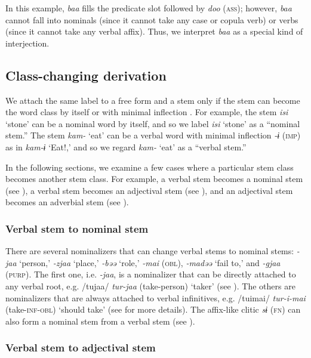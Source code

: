 In this example, \textit{baa} fills the predicate slot followed by \textit{doo} (\textsc{ass}); however, \textit{baa} cannot fall into nominals (since it cannot take any case or copula verb) or verbs (since it cannot take any verbal affix). Thus, we interpret \textit{baa} as a special kind of interjection.

\subsection{Class-changing derivation}\label{sec:4.3.8}

We attach the same label to a free form and a stem only if the stem can become the word class by itself or with minimal inflection \citep[cf.][553-554]{Lehmann2008}. For example, the stem \textit{isi} ‘stone’ can be a nominal word by itself, and so we label \textit{isi} ‘stone’ as a “nominal stem.” The stem \textit{kam-} ‘eat’ can be a verbal word with minimal inflection \textit{{}-ɨ} (\textsc{imp}) as in \textit{kam-ɨ} ‘Eat!,’ and so we regard \textit{kam-} ‘eat’ as a “verbal stem.”

In the following sections, we examine a few cases where a particular stem class becomes another stem class. For example, a verbal stem becomes a nominal stem (see ), a verbal stem becomes an adjectival stem (see ), and an adjectival stem becomes an adverbial stem (see ).

\subsubsection{Verbal stem to nominal stem}\label{sec:4.3.8.1}

There are several nominalizers that can change verbal stems to nominal stems: \textit{-jaa} ‘person,’ \textit{-zjaa} ‘place,’ \textit{-bəə} ‘role,’ \textit{-mai} (\textsc{obl}), \textit{-madəə} ‘fail to,’ and \textit{-gjaa} (\textsc{purp}). The first one, i.e. \textit{-jaa}, is a nominalizer that can be directly attached to any verbal root, e.g. /tujaa/ \textit{tur-jaa} (take-person) ‘taker’ (see ). The others are nominalizers that are always attached to verbal infinitives, e.g. /tuimai/ \textit{tur-i-mai} (take-\textsc{inf-obl}) ‘should take’ (see  for more details). The affix-like clitic \textit{sɨ} (\textsc{fn}) can also form a nominal stem from a verbal stem (see ).

\subsubsection{Verbal stem to adjectival stem}\label{sec:4.3.8.2}

